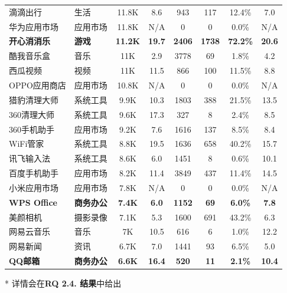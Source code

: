 \begin{ThreePartTable}
\begin{longtable}{l l c c c c c c}
\rowcolor{gray!15} 滴滴出行 & 生活 & 11.8K & 8.6 & 943 & 117 & 12.4\% & 7.0 \\
华为应用市场 & 应用市场 & 11.8K & N/A & 0 & 0 & 0.0\% & N/A\\
\rowcolor{gray!15} {\bf 开心消消乐}\tnote{*} & {\bf 游戏} & {\bf 11.2K} & {\bf 19.7} & {\bf 2406} & {\bf 1738} & {\bf 72.2\%} & {\bf 20.6} \\
酷我音乐盒 & 音乐 & 11K & 2.9 & 3778 & 69 & 1.8\% & 4.2 \\
\rowcolor{gray!15} 西瓜视频 & 视频 & 11K & 11.5 & 866 & 100 & 11.5\% & 8.8 \\
OPPO应用商店 & 应用市场 & 10.8K & N/A & 0 & 0 & 0.0\% & N/A\\
\rowcolor{gray!15} 猎豹清理大师 & 系统工具 & 9.9K & 10.3 & 1803 & 388 & 21.5\% & 13.5 \\
360清理大师 & 系统工具 & 9.6K & 17.3 & 327 & 8 & 2.4\% & 8.5 \\
\rowcolor{gray!15} 360手机助手 & 应用市场 & 9.2K & 7.6 & 1616 & 137 & 8.5\% & 8.4 \\
WiFi管家 & 系统工具 & 8.8K & 19.5 & 1636 & 658 & 40.2\% & 15.7 \\
\rowcolor{gray!15} 讯飞输入法 & 系统工具 & 8.6K & 6.0 & 1451 & 8 & 0.6\% & 10.1 \\
百度手机助手 & 应用市场 & 8.2K & 11.4 & 3849 & 437 & 11.4\% & 14.5 \\
\rowcolor{gray!15} 小米应用市场 & 应用市场 & 7.8K & N/A & 0 & 0 & 0.0\% & N/A\\
{\bf WPS Office}\tnote{*} & {\bf 商务办公} & {\bf 7.4K} & {\bf 6.0} & {\bf 1152} & {\bf 69} & {\bf 6.0\%} & {\bf 7.8} \\
\rowcolor{gray!15} 美颜相机 & 摄影录像 & 7.1K & 5.3 & 1600 & 691 & 43.2\% & 6.3 \\
网易云音乐 & 音乐 & 7K & 10.5 & 616 & 6 & 1.0\% & 12.2 \\
\rowcolor{gray!15} 网易新闻 & 资讯 & 6.7K & 7.0 & 1441 & 93 & 6.5\% & 5.0 \\
{\bf QQ邮箱}\tnote{*} & {\bf 商务办公} & {\bf 6.6K} & {\bf 16.4} & {\bf 520} & {\bf 11} & {\bf 2.1\%} & {\bf 10.4} \\
\bottomrule
\end{longtable}
\vspace{-4mm}
\begin{tablenotes}
  \item[*] 详情会在{\bf RQ 2.4. 结果}中给出
\end{tablenotes}
\end{ThreePartTable}

